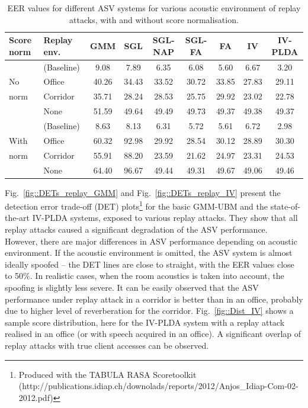 

\begin{table}
\begin{center}
    \begin{tabular}{ l l || c c c c c c c}
    \hline
Score norm & Replay env. &  GMM & SGL & SGL-NAP  & SGL-FA & FA & IV & IV-PLDA \\ 

 \hline \hline
& (Baseline) & 9.08 & 7.89 & 6.35 & 6.08 & 5.60 & 6.67 & 3.20\\
No & Office  & 40.26 & 34.43 & 33.52 & 30.72 & 33.85 & 27.83 & 29.11\\
norm & Corridor & 35.71 & 28.24 & 28.53 & 25.75 & 29.92 & 23.02 & 22.78\\
& None & 51.59 & 49.64 & 49.49 & 49.73 & 49.37 & 49.38 & 49.37\\
\hline
& (Baseline) & 8.63 & 8.13 & 6.31 & 5.72 & 5.61 & 6.72 & 2.98\\
With & Office  & 60.32 & 92.98 & 29.92 & 28.54 & 30.12 & 28.89 & 30.30\\
norm & Corridor & 55.91 & 88.20 & 23.59 & 21.62 & 24.97 & 23.31 & 24.53\\
& None & 64.40 & 96.67 & 49.44 & 49.31 & 49.67 & 49.06 & 49.46\\
\hline
    \end{tabular}
    \caption{EER values for different ASV systems for various acoustic environment of replay attacks, with and without score normalisation. }
		\label{tab::results_EER}
   \end{center}
\end{table}



Fig.~\ref{fig::DETs_replay_GMM} and Fig.~\ref{fig::DETs_replay_IV} present the detection error trade-off (DET) plots\footnote{Produced with the TABULA RASA Scoretoolkit (http://publications.idiap.ch/downolads/reports/2012/Anjos\_Idiap-Com-02-2012.pdf)}  for the basic GMM-UBM and the state-of-the-art IV-PLDA systems, exposed to various replay attacks. They show that all replay attacks caused a significant degradation of the ASV performance. However, there are major differences in ASV performance depending on acoustic environment. If the acoustic environment is omitted, the ASV system is almost ideally spoofed -- the DET lines are close to straight, with the EER values close to 50\%. In realistic cases, when the room acoustics is taken into account, the spoofing is slightly less severe. It can be easily observed that the ASV performance under replay attack in a corridor is better than in an office, probably due to higher level of reverberation for the corridor. Fig.~\ref{fig::Dist_IV} shows a sample score distribution, here for the IV-PLDA system with a replay attack realised in an office (or with speech acquired in an office). A significant overlap of replay attacks with true client accesses can be observed.

